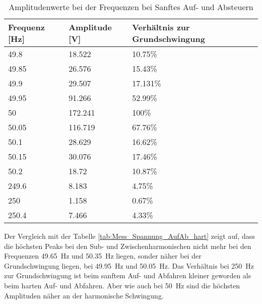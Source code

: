 \begin{table}[ht!]
	\centering
	\begin{tabular}{|l|l|l|}
		\hline
		Frequenz {[}Hz{]} & Amplitude {[}V{]} & Verhältnis zur Grundschwingung \\ \hline
		49.8              & 18.522            & 10.75\%                        \\ \hline
		49.85             & 26.576            & 15.43\%                        \\ \hline
		49.9              & 29.507            & 17.131\%                       \\ \hline
		49.95             & 91.266            & 52.99\%                        \\ \hline
		50                & 172.241           & 100\%                          \\ \hline
		50.05             & 116.719           & 67.76\%                        \\ \hline
		50.1              & 28.629            & 16.62\%                        \\ \hline
		50.15             & 30.076            & 17.46\%                        \\ \hline
		50.2              & 18.72             & 10.87\%                        \\ \hline
		249.6             & 8.183             & 4.75\%                         \\ \hline
		250               & 1.158             & 0.67\%                         \\ \hline
		250.4             & 7.466             & 4.33\%                         \\ \hline
	\end{tabular}
\caption{Amplitudenwerte bei der Frequenzen bei Sanftes Auf- und Absteuern}\label{tab:Mess_Spannung_AufAb_sanft}
\end{table}

Der Vergleich mit der Tabelle \ref{tab:Mess_Spannung_AufAb_hart} zeigt auf, dass die höchsten Peaks bei den Sub- und Zwischenharmonischen nicht mehr bei den Frequenzen \SI{49.65}{Hz} und \SI{50.35}{Hz} liegen, sonder näher bei der Grundschwingung liegen, bei \SI{49.95}{Hz} und \SI{50.05}{Hz}. Das Verhältnis bei \SI{250}{Hz} zur Grundschwingung ist beim sanftem Auf- und Abfahren kleiner geworden als beim harten Auf- und Abfahren. Aber wie auch bei \SI{50}{Hz} sind die höchsten Amplituden näher an der harmonische Schwingung. 

